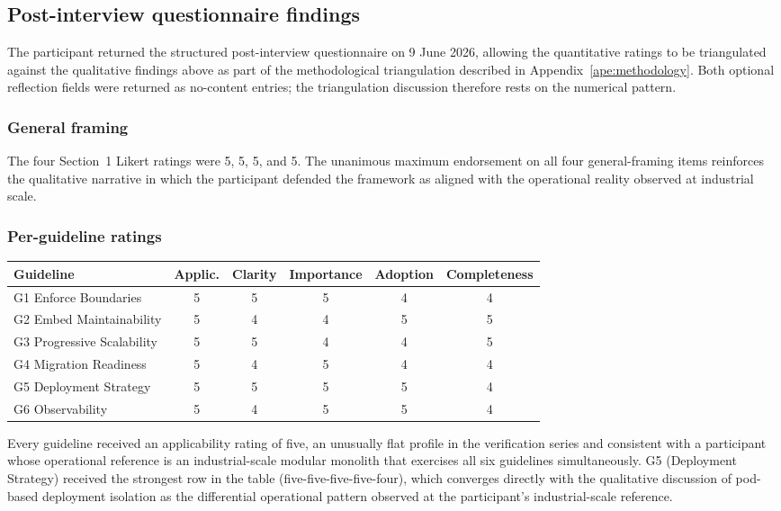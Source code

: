 \subsection*{Post-interview questionnaire findings}

The participant returned the structured post-interview questionnaire on 9 June 2026, allowing the quantitative ratings to be triangulated against the qualitative findings above as part of the methodological triangulation described in Appendix~\ref{ape:methodology}. Both optional reflection fields were returned as no-content entries; the triangulation discussion therefore rests on the numerical pattern.

\subsubsection*{General framing}

The four Section~1 Likert ratings were 5, 5, 5, and 5. The unanimous maximum endorsement on all four general-framing items reinforces the qualitative narrative in which the participant defended the framework as aligned with the operational reality observed at industrial scale.

\subsubsection*{Per-guideline ratings}

\begin{longtable}{p{2.5cm} c c c c c}
\toprule
\textbf{Guideline} & \textbf{Applic.} & \textbf{Clarity} & \textbf{Importance} & \textbf{Adoption} & \textbf{Completeness} \\
\midrule
\endhead
G1 Enforce Boundaries & 5 & 5 & 5 & 4 & 4 \\
G2 Embed Maintainability & 5 & 4 & 4 & 5 & 5 \\
G3 Progressive Scalability & 5 & 5 & 4 & 4 & 5 \\
G4 Migration Readiness & 5 & 4 & 5 & 4 & 4 \\
G5 Deployment Strategy & 5 & 5 & 5 & 5 & 4 \\
G6 Observability & 5 & 4 & 5 & 5 & 4 \\
\bottomrule
\end{longtable}

\noindent
Every guideline received an applicability rating of five, an unusually flat profile in the verification series and consistent with a participant whose operational reference is an industrial-scale modular monolith that exercises all six guidelines simultaneously. G5 (Deployment Strategy) received the strongest row in the table (five-five-five-five-four), which converges directly with the qualitative discussion of pod-based deployment isolation as the differential operational pattern observed at the participant's industrial-scale reference.


